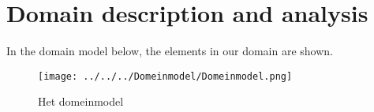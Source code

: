 \section{Domain description and analysis}
In the domain model below, the elements in our domain are shown.
\begin{figure}[H]
	\centering
	\texttt{[image: ../../../Domeinmodel/Domeinmodel.png]}
	\caption{Het domeinmodel}
	\label{cd:domeinmodel}
\end{figure}
